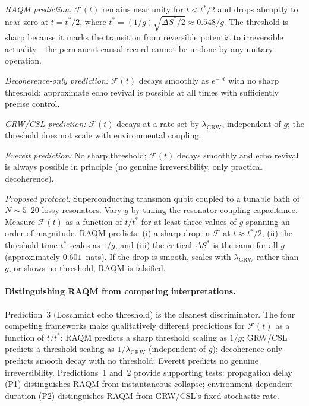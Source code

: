\documentclass[11pt,a4paper]{article}
\theoremstyle{plain}
\theoremstyle{definition}
\theoremstyle{remark}
\begin{document}
\emph{RAQM prediction:} $\mathcal{F}(t)$ remains near unity for
$t < t^*/2$ and drops abruptly to near zero at $t = t^*/2$, where
$t^* = (1/g)\sqrt{\Delta S^*/2} \approx 0.548/g$. The threshold is
sharp because it marks the transition from reversible potentia to
irreversible actuality---the permanent causal record cannot be undone
by any unitary operation.

\emph{Decoherence-only prediction:} $\mathcal{F}(t)$ decays smoothly
as $e^{-\gamma t}$ with no sharp threshold; approximate echo revival
is possible at all times with sufficiently precise control.

\emph{GRW/CSL prediction:} $\mathcal{F}(t)$ decays at a rate set by
$\lambda_{\mathrm{GRW}}$, independent of $g$; the threshold does not
scale with environmental coupling.

\emph{Everett prediction:} No sharp threshold; $\mathcal{F}(t)$ decays
smoothly and echo revival is always possible in principle (no genuine
irreversibility, only practical decoherence).

\emph{Proposed protocol:} Superconducting transmon qubit coupled to a
tunable bath of $N \sim 5$--$20$ lossy resonators. Vary $g$ by tuning
the resonator coupling capacitance. Measure $\mathcal{F}(t)$ as a
function of $t/t^*$ for at least three values of $g$ spanning an order
of magnitude. RAQM predicts: (i) a sharp drop in $\mathcal{F}$ at
$t \approx t^*/2$, (ii) the threshold time $t^*$ scales as $1/g$,
and (iii) the critical $\Delta S^*$ is the same for all $g$
(approximately $0.601$~nats). If the drop is smooth, scales with
$\lambda_{\mathrm{GRW}}$ rather than $g$, or shows no threshold,
RAQM is falsified.

\paragraph{Distinguishing RAQM from competing interpretations.}
Prediction~3 (Loschmidt echo threshold) is the cleanest discriminator.
The four competing frameworks make qualitatively different predictions
for $\mathcal{F}(t)$ as a function of $t/t^*$: RAQM predicts a sharp
threshold scaling as $1/g$; GRW/CSL predicts a threshold scaling as
$1/\lambda_{\mathrm{GRW}}$ (independent of $g$); decoherence-only
predicts smooth decay with no threshold; Everett predicts no genuine
irreversibility. Predictions~1 and~2 provide supporting tests:
propagation delay (P1) distinguishes RAQM from instantaneous collapse;
environment-dependent duration (P2) distinguishes RAQM from GRW/CSL's
fixed stochastic rate.
\end{document}
